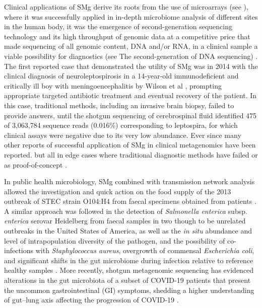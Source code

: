 Clinical applications of \ac{SMg} derive its roots from the use of microarrays (see ), where it was successfully applied in in-depth microbiome analysis of different sites in the human body, it was the emergence of second-generation sequencing technology and its high throughput of genomic data at a competitive price that made sequencing of all genomic content, DNA and/or RNA, in a clinical sample a viable possibility for diagnostics (see  The second-generation of DNA sequencing) \citep{miller_basic_2009, palmer_rapid_2006, chiu_clinical_2019}. The first reported case that demonstrated the utility of \ac{SMg} was in 2014 with the clinical diagnosis of neuroleptospirosis in a 14-year-old immunodeficient and critically ill boy with meningoencephalitis by Wilson et al \cite{wilson_actionable_2014}, prompting appropriate targeted antibiotic treatment and eventual recovery of the patient. In this case, traditional methods, including an invasive brain biopsy, failed to provide answers, until the shotgun sequencing of cerebrospinal fluid identified 475 of 3,063,784 sequence reads (0.016\%) corresponding to leptospira, for which clinical assays were negative due to its very low abundance. Ever since many other reports of successful application of \ac{SMg} in clinical metagenomics have been reported. but all in edge cases where traditional diagnostic methods have failed or as proof-of-concept \citep{couto_critical_2018, vijayvargiya_application_2019, sanabria_shotgun-metagenomics_2020, hirakata_application_2021}. 

In public health microbiology, \ac{SMg} combined with transmission network analysis allowed the investigation and quick action on the food supply of the 2013 outbreak of \ac{STEC} strain O104:H4 from faecal specimens obtained from patients \citep{loman_culture-independent_2013}. A similar approach was followed in the detection of \textit{Salmonella enterica} subsp. \textit{enterica} serovar Heidelberg from faecal samples in two though to be unrelated outbreaks in the United States of America, as well as the \textit{in situ} abundance and level of intrapopulation diversity of the pathogen, and the possibility of co-infections with \textit{Staphylococcus aureus}, overgrowth of commensal \textit{Escherichia coli}, and significant shifts in the gut microbiome during infection relative to reference healthy samples \citep{huang_metagenomics_2017}. More recently, shotgun metagenomic sequencing has evidenced alterations in the gut microbiota of a subset of COVID-19 patients that present the uncommon gastrointestinal (GI) symptoms, shedding a higher understanding of gut–lung axis affecting the progression of COVID-19 \citep{li_microbiome_2021}.


